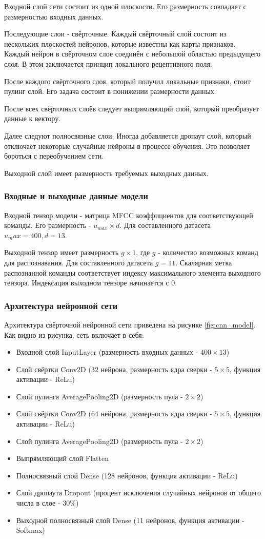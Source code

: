 Входной слой сети состоит из одной плоскости. Его размерность совпадает с размерностью входных данных. 

Последующие слои - свёрточные. Каждый свёрточный слой состоит из нескольких плоскостей нейронов, которые известны как карты признаков. Каждый нейрон в свёрточном слое соединён с небольшой областью предыдущего слоя. В этом заключается принцип локального рецептивного поля.

После каждого свёрточного слоя, который получил локальные признаки, стоит пулинг слой. Его задача состоит в понижении размерности данных.

После всех свёрточных слоёв следует выпрямляющий слой, который преобразует данные к вектору. 

Далее следуют полносвязные слои. Иногда добавляется дропаут слой, который отключает некоторые случайные нейроны в процессе обучения. Это позволяет бороться с переобучением сети.

Выходной слой имеет размерность требуемых выходных данных. 

\subsubsection{Входные и выходные данные модели}
Входной тензор модели - матрица MFCC коэффициентов для соответствующей команды. Его размерность - $u_{max} \times d$. Для составленного датасета $u_max=400, d=13$.

Выходной тензор имеет размерность $g \times 1$, где $g$ - количество возможных команд для распознавания. Для составленного датасета $g=11$. Скалярная метка распознанной команды соответствует индексу максимального элемента выходного тензора. Индексация выходном тензоре начинается с 0.
\subsubsection{Архитектура нейронной сети}
Архитектура свёрточной нейронной сети приведена на рисунке \ref{fig:cnn_model}. Как видно из рисунка, сеть включает в себя:
\begin{itemize}[leftmargin=2cm]
	\item Входной слой InputLayer (размерность входных данных - $400 \times 13$)
	\item Слой свёртки Conv2D (32 нейрона, размерность ядра сверки - $5 \times 5$, функция активации - ReLu)
	\item Слой пулинга AveragePooling2D (размерность пула - $2 \times 2$)
	\item Слой свёртки Conv2D (64 нейрона, размерность ядра сверки - $5 \times 5$, функция активации - ReLu)
	\item Слой пулинга AveragePooling2D (размерность пула - $2 \times 2$)
	\item Выпрямляющий слой Flatten
	\item Полносвязный слой Dense (128 нейронов, функция активации - ReLu)
	\item Слой дропаута Dropout (процент исключения случайных нейронов от общего числа в слое - 30\%)
	\item Выходной полносвязный слой Dense (11 нейронов, функция активации - Softmax)
\end{itemize}

